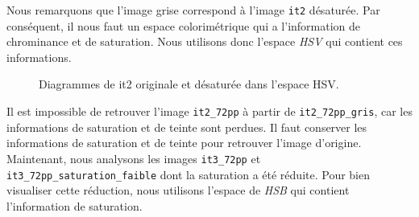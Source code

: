 \documentclass[a4paper,11pt]{article}
\begin{document}
Nous remarquons que l'image grise correspond à l'image \texttt{it2} 
désaturée. Par conséquent, il nous faut un espace colorimétrique qui 
a l'information de chrominance et de saturation. Nous utilisons donc 
l'espace \textit{HSV} qui contient ces informations.

\begin{figure}[H]
  \begin{center}  

    \caption{Diagrammes de it2 originale et désaturée dans l'espace HSV.}
  \end{center}
\end{figure}

Il est impossible de retrouver l'image \texttt{it2\_72pp} à partir de 
\texttt{it2\_72pp\_gris}, car les informations de saturation et de 
teinte sont perdues. Il faut conserver les informations de saturation 
et de teinte pour retrouver l'image d'origine.\\

Maintenant, nous analysons les images \texttt{it3\_72pp} et 
\texttt{it3\_72pp\_saturation\_faible} dont la saturation a été 
réduite. Pour bien visualiser cette réduction, nous utilisons 
l'espace de \textit{HSB} qui contient l'information de saturation.
\end{document}
